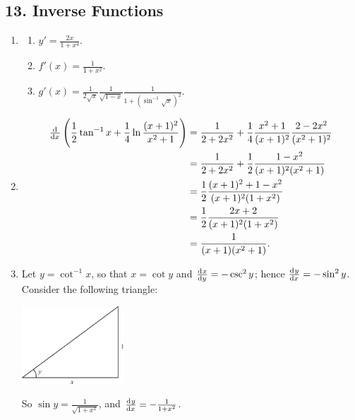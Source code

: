 \subsection*{13. Inverse Functions}
\begin{enumerate}
  \item
    \begin{enumerate}
      \item $ y' = \frac{2x}{1+x^4} $.
      \item $ f'(x) = \frac{1}{1+x^2} $.
      \item $ g'(x) = \frac{1}{2\sqrt{x}} \frac{1}{\sqrt{1 - x}} \frac{1}{1+(\sin^{-1} \sqrt{x})^2}  $.
    \end{enumerate}
  \item
    \begin{align*}
      \od{}{x} \left( \frac{1}{2} \tan^{-1} x + \frac{1}{4} \ln\frac{(x + 1)^2}{x^2 + 1} \right)
         &= \frac{1}{2 + 2x^2}  + \frac{1}{4} \frac{x^2 + 1}{(x + 1)^2} \frac{2-2x^2}{(x^2 + 1)^2}\\
         &= \frac{1}{2 + 2x^2}  + \frac{1}{2} \frac{1-x^2}{(x + 1)^2(x^2 + 1)}\\
         &= \frac{1}{2} \frac{(x + 1)^2 + 1 - x^2}{(x + 1)^2 (1 + x^2)}\\
         &= \frac{1}{2} \frac{2x + 2}{(x + 1)^2 (1 + x^2)}\\
         &= \frac{1}{(x + 1)(x^2 + 1)}.
    \end{align*}
  \item Let $ y = \cot^{-1} x $, so that $ x = \cot y $ and $ \od{x}{y} = -\csc^2 y $; hence $ \od{y}{x} = -\sin^2 y $.
        Consider the following triangle:
        \begin{center}
          \includegraphics[width=0.3\textwidth]{antitriangle2}
        \end{center}
        So $ \sin y = \frac{1}{\sqrt{1 + x^2}} $, and $ \od{y}{x} = -\frac{1}{1 + x^2} $.
\end{enumerate}

